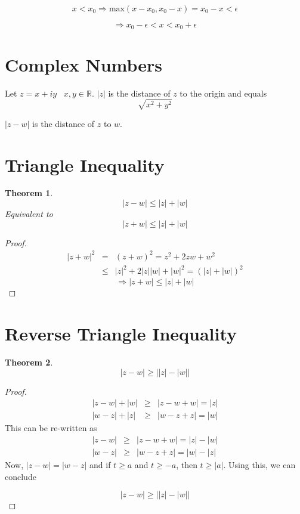 \documentclass[12pt]{scrbook}
\newtheorem{theorem}{Theorem}[section]
\begin{document}
\[ x < x_0 \Rightarrow \text{max}(x - x_0, x_0 - x) = x_0 - x < \epsilon \]

\[ \Rightarrow x_0 - \epsilon < x < x_0 + \epsilon \]

\section{Complex Numbers}

Let $z = x + iy \;\;\; x, y \in \mathbb{R} $. $ |z| $ is the distance of $z$ to the origin and equals
\[ \sqrt{x^2 + y^2} \]

$|z - w|$ is the distance of $z$ to $w$.

\section{Triangle Inequality}

\begin{theorem}
\[ |z - w| \le |z| + |w| \]
Equivalent to 
\[ |z + w| \le |z| + |w| \]
\end{theorem}

\begin{proof}
\begin{eqnarray*}
| z + w |^2 &=& (z + w)^2 = z^2 + 2zw + w^2 \\
                  &\le& |z|^2 + 2|z||w| + |w|^2 = (|z| + |w|)^2
\end{eqnarray*}
\[ \Rightarrow |z + w| \le |z| + |w| \]
\end{proof}

\section{Reverse Triangle Inequality}

\begin{theorem}
\[ |z - w| \ge \left| |z| - |w| \right| \]
\end{theorem}

\begin{proof}

\begin{eqnarray*}
|z - w| + |w| &\ge& |z - w + w | = |z| \\
|w - z| + |z|  &\ge&  |w - z + z | = |w| 
\end{eqnarray*}
This can be re-written as
\begin{eqnarray*}
|z - w| &\ge& |z - w + w | = |z| - |w| \\
|w - z|   &\ge&  |w - z + z | = |w| - |z| 
\end{eqnarray*}
Now, $|z - w| = |w - z|$ and if $t \ge a$ and $t \ge -a$, then $t \ge |a|$.  Using this, we can conclude

\[ |z - w| \ge \left| |z| - |w| \right| \]

\end{proof}
\end{document}
